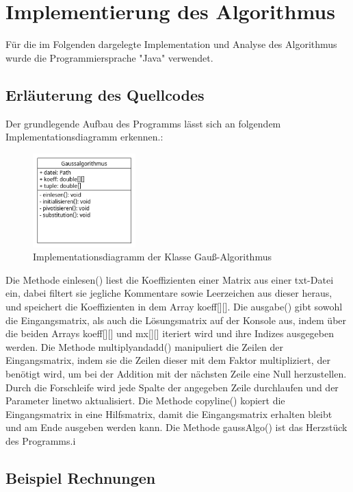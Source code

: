 \documentclass[a4paper, 12pt]{report}
\begin{document}
\begin{sloppypar}
{\let\clearpage\relax \chapter{Implementierung des Algorithmus}}
Für die im Folgenden dargelegte Implementation und Analyse des Algorithmus wurde die Programmiersprache "Java" verwendet.

\section{Erläuterung des Quellcodes}
Der grundlegende Aufbau des Programms lässt sich an folgendem Implementationsdiagramm erkennen.:
\begin{figure}[h]
    \centering
    \includegraphics[width=150px]{"./gaussuml.png"}
    \caption{Implementationsdiagramm der Klasse Gauß-Algorithmus}
\end{figure}
\newline
Die Methode einlesen() liest die Koeffizienten einer Matrix aus einer txt-Datei ein, dabei filtert sie jegliche Kommentare
sowie Leerzeichen aus dieser heraus, und speichert die Koeffizienten in dem Array koeff[][].
Die ausgabe() gibt sowohl die Eingangsmatrix, als auch die Lösungsmatrix auf der Konsole aus, indem über die beiden Arrays koeff[][] und mx[][] iteriert wird
und ihre Indizes ausgegeben werden.
Die Methode multiplyandadd() manipuliert die Zeilen der Eingangsmatrix, indem sie die Zeilen dieser
mit dem Faktor multipliziert, der benötigt wird, um bei der Addition mit der nächsten Zeile eine Null herzustellen. Durch die Forschleife wird jede Spalte der angegeben
Zeile durchlaufen und der Parameter linetwo aktualisiert.
Die Methode copyline() kopiert die Eingangsmatrix in eine Hilfsmatrix, damit die Eingangsmatrix erhalten bleibt und am Ende ausgeben werden kann.
Die Methode gaussAlgo() ist das Herzstück des Programms.i %


\section{Beispiel Rechnungen}

\end{sloppypar}
\end{document}
